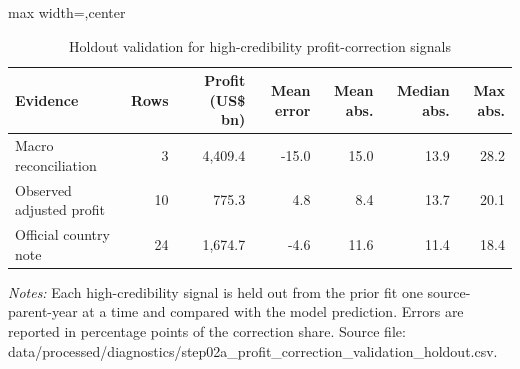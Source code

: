 \begin{table}[H]
\centering
\scriptsize
\caption{Holdout validation for high-credibility profit-correction signals}
\label{tab:profit_correction_validation_holdout}
\begin{adjustbox}{max width=\textwidth,center}
\begin{tabular}{@{}lrrrrrr@{}}
\toprule
Evidence & Rows & Profit (US\$ bn) & Mean error & Mean abs. & Median abs. & Max abs. \\
\midrule
Macro reconciliation &  3 & 4,409.4 & -15.0 & 15.0 & 13.9 & 28.2 \\
Observed adjusted profit & 10 &   775.3 &   4.8 &  8.4 & 13.7 & 20.1 \\
Official country note & 24 & 1,674.7 &  -4.6 & 11.6 & 11.4 & 18.4 \\
\bottomrule
\end{tabular}
\end{adjustbox}

\vspace{0.5em}
\begin{minipage}{0.96\textwidth}
\footnotesize\raggedright \textit{Notes:} Each high-credibility signal is held out from the prior fit one source-parent-year at a time and compared with the model prediction. Errors are reported in percentage points of the correction share. Source file: data/processed/diagnostics/step02a\_profit\_correction\_validation\_holdout.csv.
\end{minipage}
\end{table}
